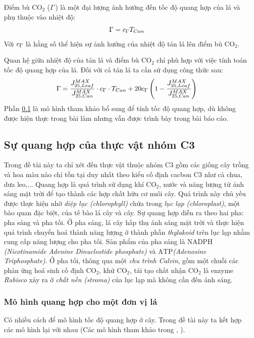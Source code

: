 \documentclass[a4paper]{article}
\begin{document}
Điểm bù $\mathrm{CO_2}$ ($\Gamma$\,) là một đại lượng ảnh hưởng đến tốc độ quang hợp của lá và phụ thuộc vào nhiệt độ:
\begin{equation}
    \Gamma = c_{\footnotesize{\Gamma}} T_{Can}
\end{equation}
Với $c_{\footnotesize{\Gamma}}$ là hằng số thể hiện sự ảnh hưởng của nhiệt độ tán lá lên điểm bù $\mathrm{CO_2}$.  
\par
Quan hệ giữa nhiệt độ của tán lá và điểm bù $\mathrm{CO_2}$ chỉ phù hợp với việc tính toán tốc độ quang hợp của lá. Đối với cả tán lá ta cần sử dụng công thức sau:
\begin{equation}\label{Gamma}
    \Gamma = \dfrac{J^{MAX}_{25,Leaf}}{J^{MAX}_{25,Can}}\cdot c_{\footnotesize{\Gamma}}\cdot T_{Can} + 20 c_{\footnotesize{\Gamma}}\left(1 - \dfrac{J^{MAX}_{25,Leaf}}{J^{MAX}_{25,Can}}\right)
\end{equation}
Phần \ref{c3} là mô hình tham khảo bổ sung để tính tốc độ quang hợp, dù không được hiện thực trong bài làm nhưng vẫn được trình bày trong bài báo cáo.
\subsection{Sự quang hợp của thực vật nhóm C3}\label{c3}
Trong đề tài này ta chỉ xét đến thực vật thuộc nhóm C3 gồm các giống cây trồng và hoa màu nào chỉ tồn tại duy nhất theo kiểu cố định cacbon C3 như cà chua, dưa leo,... Quang hợp là quá trình sử dụng khí $\mathrm{CO_2}$, nước và năng lượng từ ánh sáng mặt trời để tạo thành các hợp chất hữu cơ nuôi cây. Quá trình này chủ yếu được thực hiện nhờ \emph{diệp lục (chlorophyll)} chứa trong \emph{lục lạp (chloroplast)}, một bào quan đặc biệt, của tế bào lá cây và cây. Sự quang hợp diễn ra theo hai pha: pha sáng và pha tối. Ở pha sáng, lá cây hấp thụ ánh sáng mặt trời và thực hiện quá trình chuyển hoá thành năng lượng ở thành phần \emph{thylakoid} trên lục lạp nhằm cung cấp năng lượng cho pha tối. Sản phẩm của pha sáng là $\mathrm{NADPH}$  \emph{(Nicotinamide Adenine Dinucleotide phosphate)} và $\mathrm{ATP}$\emph{(Adenosine Triphosphate)}. Ở pha tối, thông qua một  \emph{chu trình Calvin}, gồm một chuỗi các phản ứng hoá sinh cố định $\mathrm{CO_2}$, khử $\mathrm{CO_2}$, tái tạo chất nhận $\mathrm{CO_2}$ là enzyme \emph{Rubisco} xảy ra ở \emph{chất nền (stroma)} của lục lạp mà không cần đến ánh sáng. 


\subsubsection{Mô hình quang hợp cho một đơn vị lá}
Có nhiều cách để mô hình tốc độ quang hợp ở cây. Trong đề tài này ta kết hợp các mô hình lại với nhau (Các mô hình tham khảo trong \cite{Lommen1975}, \cite{vanthoor2011model}).
\end{document}
